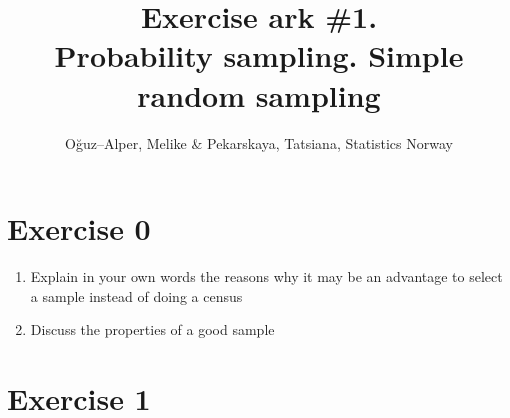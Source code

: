 \documentclass[12pt]{article}
\begin{document}
\title{Exercise ark \#1.\\ Probability sampling. Simple random sampling}
\author{O\u{g}uz--Alper, Melike \& Pekarskaya, Tatsiana, Statistics Norway}
\maketitle

\section*{Exercise 0}

\begin{enumerate}
\item Explain in your own words the reasons why it may be an advantage to select a sample instead of doing a census
\item Discuss the properties of a good sample
\end{enumerate}

\section*{Exercise 1}
\end{document}
